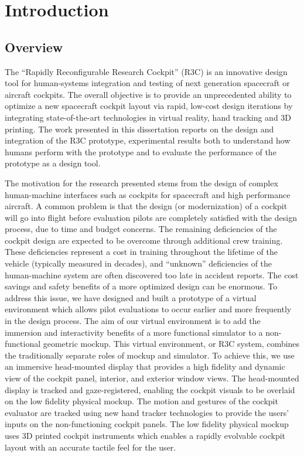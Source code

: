 \chapter{Introduction}

\section{Overview}
\label{overview}

The ``Rapidly Reconfigurable Research Cockpit'' (R3C) is an innovative design tool for human-systems integration and testing of next generation spacecraft or aircraft cockpits.
The overall objective is to provide an unprecedented ability to optimize a new spacecraft cockpit layout via rapid, low-cost design iterations by integrating state-of-the-art technologies in virtual reality, hand tracking and 3D printing.
The work presented in this dissertation reports on the design and integration of the R3C prototype, experimental results both to understand how humans perform with the prototype and to evaluate the performance of the prototype as a design tool.

The motivation for the research presented stems from the design of complex human-machine interfaces such as cockpits for spacecraft and high performance aircraft.
A common problem is that the design (or modernization) of a cockpit will go into flight before evaluation pilots are completely satisfied with the design process, due to time and budget concerns.
The remaining deficiencies of the cockpit design are expected to be overcome through additional crew training.
These deficiencies represent a cost in training throughout the lifetime of the vehicle (typically measured in decades), and ``unknown'' deficiencies of the human-machine system are often discovered too late in accident reports.
The cost savings and safety benefits of a more optimized design can be enormous.
To address this issue, we have designed and built a prototype of a virtual environment which allows pilot evaluations to occur earlier and more frequently in the design process.
The aim of our virtual environment is to add the immersion and interactivity benefits of a more functional simulator to a non-functional geometric mockup.
This virtual environment, or R3C system, combines the traditionally separate roles of mockup and simulator.
To achieve this, we use an immersive head-mounted display that provides a high fidelity and dynamic view of the cockpit panel, interior, and exterior window views.
The head-mounted display is tracked and gaze-registered, enabling the cockpit visuals to be overlaid on the low fidelity physical mockup.
The motion and gestures of the cockpit evaluator are tracked using new hand tracker technologies to provide the users' inputs on the non-functioning cockpit panels.
The low fidelity physical mockup uses 3D printed cockpit instruments which enables a rapidly evolvable cockpit layout with an accurate tactile feel for the user.

